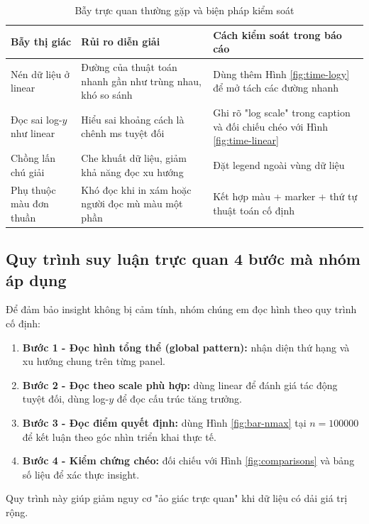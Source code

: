 \begin{table}[H]
\centering
\renewcommand{\arraystretch}{1.2}
\begin{tabular}{p{4.0cm}p{4.8cm}p{4.2cm}}
\toprule
\textbf{Bẫy thị giác} & \textbf{Rủi ro diễn giải} & \textbf{Cách kiểm soát trong báo cáo} \\
\midrule
Nén dữ liệu ở linear & Đường của thuật toán nhanh gần như trùng nhau, khó so sánh & Dùng thêm Hình \ref{fig:time-logy} để mở tách các đường nhanh \\
Đọc sai log-$y$ như linear & Hiểu sai khoảng cách là chênh ms tuyệt đối & Ghi rõ "log scale" trong caption và đối chiếu chéo với Hình \ref{fig:time-linear} \\
Chồng lấn chú giải & Che khuất dữ liệu, giảm khả năng đọc xu hướng & Đặt legend ngoài vùng dữ liệu \\
Phụ thuộc màu đơn thuần & Khó đọc khi in xám hoặc người đọc mù màu một phần & Kết hợp màu + marker + thứ tự thuật toán cố định \\
\bottomrule
\end{tabular}
\caption{Bẫy trực quan thường gặp và biện pháp kiểm soát}
\label{tab:viz-pitfalls}
\end{table}

\subsection{Quy trình suy luận trực quan 4 bước mà nhóm áp dụng}

Để đảm bảo insight không bị cảm tính, nhóm chúng em đọc hình theo quy trình cố định:
\begin{enumerate}[leftmargin=1.2cm]
    \item \textbf{Bước 1 - Đọc hình tổng thể (global pattern):} nhận diện thứ hạng và xu hướng chung trên từng panel.
    \item \textbf{Bước 2 - Đọc theo scale phù hợp:} dùng linear để đánh giá tác động tuyệt đối, dùng log-$y$ để đọc cấu trúc tăng trưởng.
    \item \textbf{Bước 3 - Đọc điểm quyết định:} dùng Hình \ref{fig:bar-nmax} tại $n=100000$ để kết luận theo góc nhìn triển khai thực tế.
    \item \textbf{Bước 4 - Kiểm chứng chéo:} đối chiếu với Hình \ref{fig:comparisons} và bảng số liệu để xác thực insight.
\end{enumerate}

Quy trình này giúp giảm nguy cơ "ảo giác trực quan" khi dữ liệu có dải giá trị rộng.

